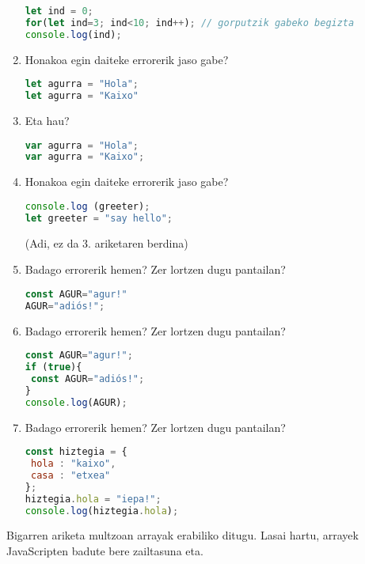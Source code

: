 \begin{enumerate}
\begin{lstlisting}[language=JavaScript,numbers=none]
let ind = 0;
for(let ind=3; ind<10; ind++); // gorputzik gabeko begizta
console.log(ind);
\end{lstlisting}

\item Honakoa egin daiteke errorerik jaso gabe?

\begin{lstlisting}[language=JavaScript,numbers=none]
let agurra = "Hola";
let agurra = "Kaixo"
 \end{lstlisting}
 
 \item  Eta hau?
\begin{lstlisting}[language=JavaScript,numbers=none]
var agurra = "Hola";
var agurra = "Kaixo";
 \end{lstlisting}
 
 \item  Honakoa egin daiteke errorerik jaso gabe?
 
\begin{lstlisting}[language=JavaScript,numbers=none]
console.log (greeter);
let greeter = "say hello";
 \end{lstlisting}
 (Adi, ez da 3. ariketaren berdina)
 
 \item Badago errorerik hemen? Zer lortzen dugu pantailan?
\begin{lstlisting}[language=JavaScript,numbers=none]
const AGUR="agur!"
AGUR="adiós!";
 \end{lstlisting}
 
 \item Badago errorerik hemen? Zer lortzen dugu pantailan?
\begin{lstlisting}[language=JavaScript,numbers=none]
const AGUR="agur!";
if (true){
 const AGUR="adiós!";
}
console.log(AGUR);
 \end{lstlisting}
 
 \item  Badago errorerik hemen? Zer lortzen dugu pantailan?
 
\begin{lstlisting}[language=JavaScript,numbers=none]
const hiztegia = {
 hola : "kaixo",
 casa : "etxea"
};
hiztegia.hola = "iepa!";
console.log(hiztegia.hola);
 \end{lstlisting}

\end{enumerate}

Bigarren ariketa multzoan arrayak erabiliko ditugu. Lasai hartu, arrayek JavaScripten badute bere zailtasuna eta.
 
